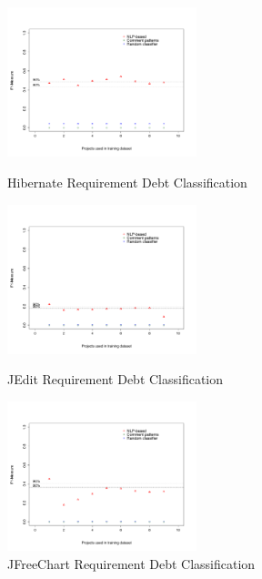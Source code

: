\clearpage
\begin{figure}[thb!]
  \centering
  \includegraphics[width=0.49\textwidth]{figures/appendix/iteration_details/implementation_hibernate.pdf}
  \caption{Hibernate Requirement Debt Classification}
  \label{fig:implementation_hibernate}
  \includegraphics[width=0.49\textwidth]{figures/appendix/iteration_details/implementation_jedit.pdf}
  \caption{JEdit Requirement Debt Classification}
  \label{fig:implementation_jedit}
  \includegraphics[width=0.49\textwidth]{figures/appendix/iteration_details/implementation_jfreechart.pdf}
  \caption{JFreeChart Requirement Debt Classification}
  \label{fig:implementation_jfreechart}  
    
\end{figure}

